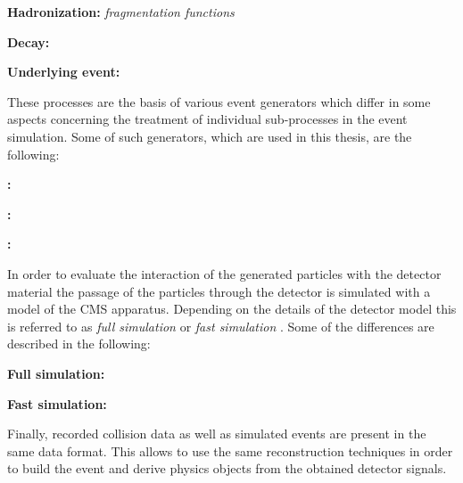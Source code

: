 \begin{description}
 \item \textbf{Hadronization:} \textit{fragmentation functions}
 \item \textbf{Decay:}
 \item \textbf{Underlying event:}
\end{description}
These processes are the basis of various event generators which differ in some aspects concerning the treatment of individual sub-processes in the event simulation. Some of such generators, which are used in this thesis, are the following:  
\begin{description}
 \item \textbf{\pythia:}
 \item \textbf{\madgraph:}
 \item \textbf{\herwig:}
\end{description}
In order to evaluate the interaction of the generated particles with the detector material the passage of the particles through the detector is simulated with a model of the CMS apparatus. Depending on the details of the detector model this is referred to as \textit{full simulation} or \textit{fast simulation} . Some of the differences are described in the following: 
\begin{description}
 \item \textbf{Full simulation:} 
 \item \textbf{Fast simulation:} 
\end{description}
Finally, recorded collision data as well as simulated events are present in the same data format. This allows to use the same reconstruction techniques in order to build the event and derive physics objects from the obtained detector signals.


